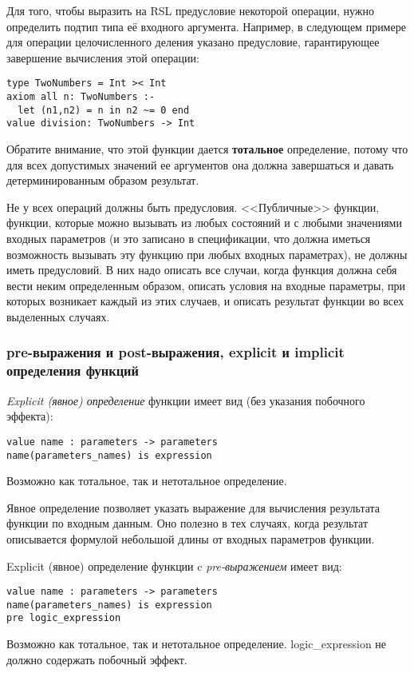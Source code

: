 \documentclass[14pt, twoside]{extreport}
\newcommand{\head}[1]{\vspace{1cm}\subsubsection*{#1}}
\begin{document}
Для того, чтобы выразить на RSL предусловие некоторой операции, нужно определить подтип типа её входного аргумента. Например, в следующем примере для операции целочисленного деления указано предусловие, гарантирующее завершение вычисления этой операции:
\begin{lstlisting}
type TwoNumbers = Int >< Int
axiom all n: TwoNumbers :-
  let (n1,n2) = n in n2 ~= 0 end
value division: TwoNumbers -> Int
\end{lstlisting}

Обратите внимание, что этой функции дается \textbf{тотальное} определение, потому что для всех допустимых значений ее аргументов она должна завершаться и давать детерминированным образом результат.

Не у всех операций должны быть предусловия. <<Публичные>> функции, функции, которые можно вызывать из любых состояний и с любыми значениями входных параметров (и это записано в спецификации, что должна иметься возможность вызывать эту функцию при любых входных параметрах), не должны иметь предусловий. В них надо описать все случаи, когда функция должна себя вести неким определенным образом, описать условия на входные параметры, при которых возникает каждый из этих случаев, и описать результат функции во всех выделенных случаях.


\head{pre-выражения и post-выражения, explicit и implicit определения функций}

\emph{Explicit (явное) определение} функции имеет вид (без указания побочного эффекта):
\begin{lstlisting}
value name : parameters -> parameters
name(parameters_names) is expression
\end{lstlisting}

Возможно как тотальное, так и нетотальное определение.

Явное определение позволяет указать выражение для вычисления результата функции по входным данным. Оно полезно в тех случаях, когда результат описывается формулой небольшой длины от входных параметров функции.

Explicit (явное) определение функции c \emph{pre-выражением} имеет вид:
\begin{lstlisting}
value name : parameters -> parameters
name(parameters_names) is expression
pre logic_expression
\end{lstlisting}

Возможно как тотальное, так и нетотальное определение. logic\_expression не должно содержать побочный эффект.
\end{document}
